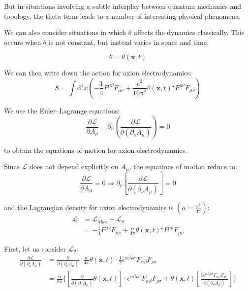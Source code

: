 But in situations involving a subtle interplay between quantum mechanics and topology, 
the theta term leads to a number of interesting physical phenomena.

We can also consider situations in which $\theta$ affects the dynamics classically. This occurs when $\theta$ is not constant, but instead varies in space and time.

\begin{equation}
\theta = \theta(\bm{x}, t)
\end{equation}

We can then write down the action for axion electrodynamics:
\begin{equation}
S = \int \mathrm{d}^4x (-\frac{1}{4} F^{\mu\nu} F_{\mu\nu} + \frac{e^2}{16\mathrm{\pi}^2} \theta(\bm{x}, t) {}^\star F^{\mu\nu} F_{\mu\nu})
\end{equation}

We use the Euler--Lagrange equations:
\begin{equation}
\frac{\partial \mathcal{L}}{\partial A_\mu} - \partial_\nu (\frac{\partial \mathcal{L}}{\partial (\partial_\nu A_\mu)}) = 0
\end{equation}

to obtain the equations of motion for axion electrodynamics.

Since $\mathcal{L}$ does not depend explicitly on $A_\mu$, the equations of motion reduce to:
\begin{equation}
\frac{\partial \mathcal{L}}{\partial A_\mu} = 0 \Rightarrow \partial_\nu [\frac{\partial \mathcal{L}}{\partial (\partial_\nu A_\mu)}] = 0
\end{equation}

and the Lagrangian density for axion electrodynamics is $(\alpha = \frac{e^2}{4\mathrm{\pi}})$:
\begin{equation}
\begin{aligned}
\mathcal{L} &= \mathcal{L}_{Max} + \mathcal{L}_\theta \\
&= -\frac{1}{4} F^{\mu\nu} F_{\mu\nu} + \frac{\alpha}{4\mathrm{\pi}} \theta(\bm{x}, t) {}^\star F^{\mu\nu} F_{\mu\nu}
\end{aligned}
\end{equation}

First, let us consider $\mathcal{L}_\theta$:
\begin{equation}
\begin{aligned}
\frac{\partial \mathcal{L}}{\partial (\partial_\nu A_\mu)} &= \frac{\partial}{\partial (\partial_\nu A_\mu)} \cdot \frac{\alpha}{4\mathrm{\pi}} \theta(\bm{x}, t) \cdot \frac{1}{2} \epsilon^{\alpha\beta\rho\sigma} F_{\alpha\beta} F_{\rho\sigma} \\
&= \frac{\alpha}{8\mathrm{\pi}} \{ [\frac{\partial}{\partial (\partial_\nu A_\mu)} \theta(\bm{x}, t)] \cdot \epsilon^{\alpha\beta\rho\sigma} F_{\alpha\beta} F_{\rho\sigma} + \theta(\bm{x}, t) [\frac{\partial \epsilon^{\alpha\beta\rho\sigma} F_{\alpha\beta} F_{\rho\sigma}}{\partial (\partial_\nu A_\mu)}] \}
\end{aligned}
\end{equation}

